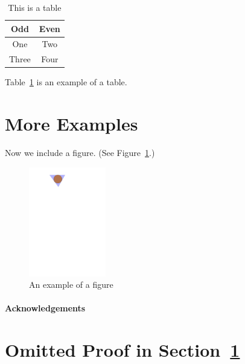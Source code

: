 \documentclass[a4paper]{article}
\theoremstyle{plain}
\theoremstyle{definition}
\begin{document}
	\begin{table}[ht]
		\centering
		\begin{tabular}{|c|c|}
			\hline
			\textbf{Odd} & \textbf{Even} \\
			\hline\hline
			One & Two \\
			\hline
			Three & Four \\
			\hline
		\end{tabular}
		\caption{This is a table}
		\label{tbl:1}
	\end{table}

	Table~\ref*{tbl:1} is an example of a table.
	
	\section{More Examples}
	\label{sec:examples}
	
	Now we include a figure.
	(See Figure~\ref{fig:example}.)
	\begin{figure}[ht]
		\centering
		\includegraphics[width=0.3\textwidth]{example}
		\caption{An example of a figure}
		\label{fig:example}
	\end{figure}
	
	\paragraph{Acknowledgements} \lipsum[6]
	
	
	
	\appendix
	
	\section{Omitted Proof in Section~\ref{sec:examples}}
	\label{app:1}
	
	\lipsum[7]
	
\end{document}
